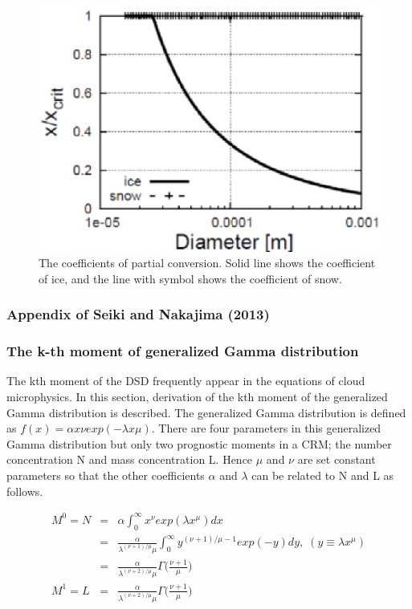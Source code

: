 \begin{figure}[]
\begin{center}
\includegraphics[scale=0.5]{./figure/partial_conversion_coef.eps}
\end{center}
\caption{The coefficients of partial conversion. Solid line shows the coefficient of ice, and the line with symbol shows the coefficient of snow.}
\label{figsn2-23}
\end{figure}

\subsubsection{Appendix of Seiki and Nakajima (2013)}
\subsubsection{The k-th moment of generalized Gamma distribution}
The kth moment of the DSD frequently appear in the equations of cloud microphysics. In this section, derivation of the kth moment of the generalized Gamma distribution is described. The generalized Gamma distribution is defined as $f(x) = \alpha x \nu exp(-\lambda x \mu)$. There are four parameters in this generalized Gamma distribution but only two prognostic moments in a CRM; the number concentration N and mass concentration L. Hence $\mu$ and $\nu$ are set constant parameters so that the other coefficients $\alpha$ and $\lambda$ can be related to N and L as follows.

\begin{eqnarray}
M^{0}=N&=&\alpha\int_{0}^{\infty}x^{\nu}exp(\lambda x^{\mu})dx\nonumber\\
&=&\frac{\alpha}{\lambda^{(\nu+1)/\mu}\mu}\int_{0}^{\infty}y^{(\nu+1)/\mu-1}exp(-y)dy,\;(y\equiv\lambda x^{\mu})\nonumber\\
&=&\frac{\alpha}{\lambda^{(\nu+2)/\mu}\mu}\Gamma\bigl(\frac{\nu+1}{\mu}\bigr)\label{sn255}\\
M^{1}=L&=&\frac{\alpha}{\lambda^{(\nu+2)/\mu}\mu}\Gamma\bigl(\frac{\nu+1}{\mu}\bigr)\nonumber
\end{eqnarray}


